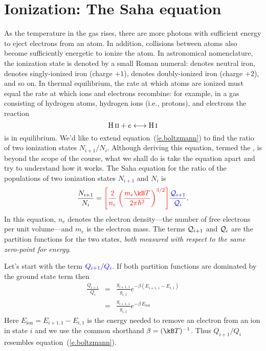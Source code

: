 \section{Ionization: The Saha equation}
\label{s.saha-eqn}

As the temperature in the gas rises, there are more photons with sufficient energy to eject electrons from an atom. In addition, collisions between atoms also become sufficiently energetic to ionize the atom. In astronomical nomenclature, the ionization state is denoted by a small Roman numeral:  denotes neutral iron,  denotes singly-ionized iron (charge $+1$),  denotes doubly-ionized iron (charge $+2$), and so on. In thermal equilibrium, the rate at which atoms are ionized must equal the rate at which ions and electrons recombine: for example, in a gas consisting of hydrogen atoms, hydrogen ions (i.e., protons), and electrons the reaction
\[
	\mathrm{H}\,\textrm{\scshape ii} + e \longleftrightarrow \mathrm{H}\,\textrm{\scshape i}
\]
is in equilibrium. We'd like to extend equation~(\ref{e.boltzmann}) to find the ratio of two ionization states $N_{i+1}/N_{i}$. Although deriving this equation, termed the , is beyond the scope of the course, what we shall do is take the equation apart and try to understand how it works.  The Saha equation for the ratio of the populations of two ionization states
$N_{i+1}$ and $N_{i}$ is
\begin{equation}\label{e.saha}
\frac{N_{i+1}}{N_{i}} 
= {\color{red}\left[\frac{2}{n_{e}}
\left(\frac{m_{e}\kB T}{2\pi\hbar^{2}}\right)^{3/2}\right]}
{\color{blue}\frac{\pfcn_{i+1}}{\pfcn_{i}}}.
\end{equation}
In this equation, $n_{e}$ denotes the electron density---the number of free electrons per unit volume---and $m_{e}$ is the electron mass. The terms $\mathcal{Q}_{i+1}$ and $\mathcal{Q}_{i}$ are the partition functions for the two states, \emph{both measured with respect to the same zero-point for energy}.

Let's start with the term $\color{blue} Q_{i+1}/Q_{i}$. If both partition functions are dominated by the ground state term then
\begin{eqnarray*}
	\frac{Q_{i+1}}{Q_{i}} &=& \frac{g_{i+1,1}}{g_{i,1}} e^{-\beta (E_{i+1,1}-E_{i,1})}\\
	&=& \frac{g_{i+1,1}}{g_{i,1}} e^{-\beta\,E_{\mathrm{ion}}}
\end{eqnarray*}
Here $E_{\mathrm{ion}} = E_{i+1,1} - E_{i,1}$ is the energy needed to remove an electron from an ion in state $i$ and we use the common shorthand $\beta = (\kB T)^{-1}$. Thus $Q_{i+1}/Q_{i}$ resembles equation~(\ref{e.boltzmann}).


